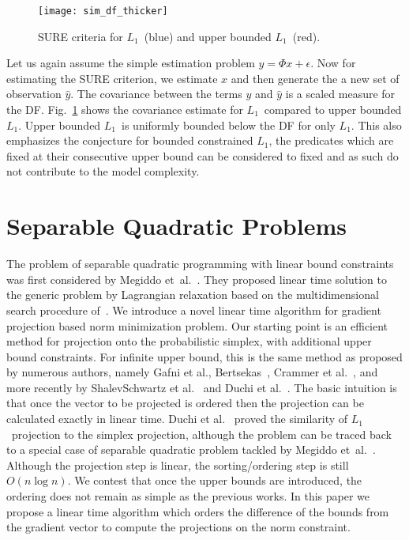\documentclass{article}
\def\etal{{et~al.}}
\def\Lo{$L_1$~}
\begin{document}
\begin{figure}[ht!]
\centering
\texttt{[image: sim\_df\_thicker]}
\caption{SURE criteria for \Lo (blue) and upper bounded \Lo (red). \label{Fig:df}
}
\end{figure}
Let us again assume the simple estimation problem $y = \Phi x + \epsilon$. Now for estimating the SURE criterion, we estimate $x$ and then generate the a new set of observation $\hat{y}$. The covariance between the terms $y$ and $\hat{y}$ is a scaled measure for the DF. Fig.~\ref{Fig:df} shows the covariance estimate for \Lo compared to upper bounded $L_1$. Upper bounded \Lo is uniformly bounded below the DF for only $L_1$. This also emphasizes the conjecture for bounded constrained $L_1$, the predicates which are fixed at their consecutive upper bound can be considered to fixed and as such do not contribute to the model complexity.






\section{Separable Quadratic Problems}
The problem of separable quadratic programming with linear bound constraints was first considered by Megiddo \etal~\cite{Megiddo93}. They proposed linear time solution to the generic problem by Lagrangian relaxation based on the multidimensional search procedure of~\cite{Megiddo84}. We introduce a novel linear time algorithm for gradient projection based norm minimization problem. Our starting point is an efficient method for projection onto the probabilistic simplex, with additional upper bound constraints. For infinite upper bound, this is the same method as proposed by numerous authors, namely Gafni et al.\cite{Gafni84}, Bertsekas~\cite{Bertsekas99}, Crammer et al.~\cite{Crammer00}, and more recently by ShalevSchwartz et al.~\cite{ShalevShwartz06} and Duchi et al.~\cite{Duchi08}. The basic intuition is that once the vector to be projected is ordered then the projection can be calculated exactly in linear time. Duchi et al.~\cite{Duchi08} proved the similarity of \Lo projection to the simplex projection, although the problem can be traced back to a special case of separable quadratic problem tackled by Megiddo \etal~\cite{Megiddo93}. Although the projection step is linear, the sorting/ordering step is still $O(n \log n)$. We contest that once the upper bounds are introduced, the ordering does not remain as simple as the previous works. In this paper we propose a linear time algorithm which orders the difference of the bounds from the gradient vector to compute the projections on the norm constraint.
\end{document}
